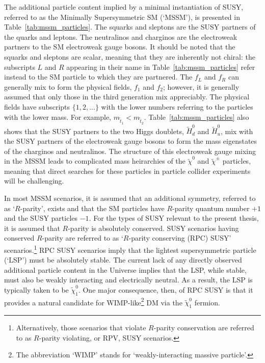 The additional particle content implied by a minimal instantiation of SUSY, referred
to as the Minimally Supersymmetric SM (`MSSM'), is presented in Table~\ref{tab:mssm_particles}.
The squarks and sleptons are the SUSY partners of the quarks and leptons.
The neutralinos and charginos are the electroweak partners to the SM electroweak gauge bosons.
It should be noted that the squarks and sleptons are scalar, meaning that they are inherently not chiral:
the subscripts $L$ and $R$ appearing in their name in Table~\ref{tab:mssm_particles} refer instead to the SM particle to which they are partnered.
The $f_L$ and $f_R$ can generally mix to form the physical fields, $f_1$ and $f_2$; however, it is generally assumed
that only those in the third generation mix appreciably.
The physical fields have subscripts $\{1,2,...\}$ with the lower numbers referring to the particles
with the lower mass.
For example, $m_{\tilde{t}_1} < m_{\tilde{t}_2}$.
Table~\ref{tab:mssm_particles} also shows that the SUSY partners to the two Higgs doublets, $\tilde{H}^0_d$ and $\tilde{H}^{0}_u$, mix with the
SUSY partners of the electroweak gauge bosons to form the mass eigenstates of the charginos and neutralinos.
The structure of this electroweak gauge mixing in the MSSM
leads to complicated mass heirarchies of the $\tilde{\chi}^0$ and $\tilde{\chi}^{\pm}$ particles, meaning that direct searches
for these particles in particle collider experiments will be challenging.

In most MSSM scenarios, it is assumed that an additional symmetry, referred to as `$R$-parity', exists
and that the SM particles have $R$-parity quantum number $+1$ and the SUSY particles $-1$.
For the types of SUSY relevant to the present thesis, it is assumed that $R$-parity is absolutely conserved.
SUSY scenarios having conserved $R$-parity are referred to as `$R$-parity conserving (RPC) SUSY' scenarios.\footnote{
Alternatively, those scenarios that violate $R$-parity conservation are referred to as $R$-parity violating, or RPV, SUSY scenarios.
}
RPC SUSY scenarios imply that the lightest supersymmetric particle (`LSP') must be absolutely stable.
The current lack of any directly observed additional particle content in the Universe implies that the LSP, while stable,
must also be weakly interacting and electrically neutral.
As a result, the LSP is typically taken to be $\tilde{\chi}^0_1$.
One major consequence, then, of RPC SUSY is that it provides a natural candidate for WIMP-like\footnote{
The abbreviation `WIMP' stands for `weakly-interacting massive particle'.
} DM via the $\tilde{\chi}^0_1$ fermion.

